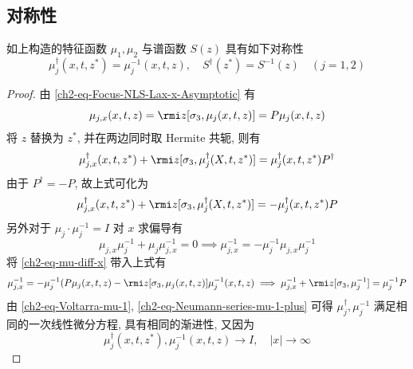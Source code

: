 \subsection{对称性}
\begin{theorem}
    如上构造的特征函数 $ \mu_{1}, \mu_{2} $ 与谱函数 $ S(z) $ 具有如下对称性
    \begin{equation}
        \mu_{j}^{\dagger}(x,t,z^{*}) = \mu_{j}^{-1}(x,t,z), \quad S^{\dagger}(z^{*}) = S^{-1}(z) \quad( j = 1,2 )
    \end{equation}
\end{theorem}
\begin{proof}
    由 \eqref{ch2-eq-Focus-NLS-Lax-x-Asymptotic} 有
    \begin{equation}
        \mu_{j,x}(x,t,z) = \rmi z [\sigma_{3}, \mu_{j}(x,t,z)] = P \mu_{j}(x,t,z) \label{ch2-eq-mu-diff-x}
    \end{equation}
    将 $ z $ 替换为 $ z^{*} $, 并在两边同时取 Hermite 共轭, 则有
    \begin{equation}
        \mu_{j,x}^{\dagger}(x,t,z^{*}) + \rmi z [\sigma_{3}, \mu_{j}^{\dagger}(X,t,z^{*})] = \mu_{j}^{\dagger}(x,t,z^{*}) P^{\dagger}
    \end{equation}
    由于 $ P^{\dagger} = -P $, 故上式可化为
    \begin{equation}
        \mu_{j,x}^{\dagger}(x,t,z^{*}) + \rmi z [\sigma_{3}, \mu_{j}^{\dagger}(X,t,z^{*})] = - \mu_{j}^{\dagger}(x,t,z^{*}) P
    \end{equation}
    另外对于 $ \mu_{j} \cdot \mu_{j}^{-1} = I $ 对 $ x $ 求偏导有
    \begin{equation}
        \mu_{j,x} \mu_{j}^{-1} + \mu_{j} \mu_{j,x}^{-1} = 0 \implies \mu_{j,x}^{-1}  = - \mu_{j}^{-1} \mu_{j,x} \mu_{j}^{-1}
    \end{equation}
    将 \eqref{ch2-eq-mu-diff-x} 带入上式有
    \begin{equation}
        \mu_{j,x}^{-1} = - \mu_{j}^{-1} ( P \mu_{j}(x,t,z) - \rmi z [\sigma_{3}, \mu_{j}(x,t,z)] \mu_{j}^{-1}(x,t,z) \implies \mu_{j,x}^{-1} + \rmi z [\sigma_{3},\mu_{j}^{-1}] = \mu_{j}^{-1} P
    \end{equation}
    由 \eqref{ch2-eq-Voltarra-mu-1}, \eqref{ch2-eq-Neumann-series-mu-1-plus} 可得 $ \mu_{j}^{\dagger}, \mu_{j}^{-1} $ 满足相同的一次线性微分方程, 具有相同的渐进性, 又因为
    \begin{equation}
        \mu_{j}^{\dagger}(x,t,z^{*}) , \mu_{j}^{-1}(x,t,z) \to I , \quad | x | \to \infty \label{ch2-eq-mu-Hermitian-asymptotic}
    \end{equation}

\end{proof}
